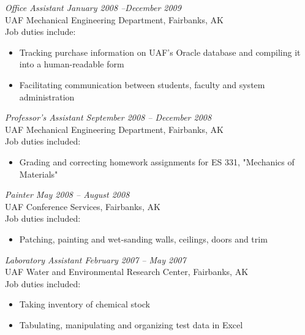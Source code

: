 \documentclass[10pt, letterpaper]{resume}
\begin{document}
\large\textit{Office Assistant \hfill January 2008 --December 2009}\normalsize \\
UAF Mechanical Engineering Department, Fairbanks, AK\\
Job duties include:
\small\begin{itemize}
\item Tracking purchase information on UAF's Oracle database and compiling it
into a human-readable form
\item Facilitating communication between students, faculty and system
administration
\end{itemize}\normalsize\medskip

\large\textit{Professor's Assistant	\hfill September 2008 -- December 2008}\normalsize \\
UAF Mechanical Engineering Department, Fairbanks, AK\\
Job duties included:
\small\begin{itemize}
\item Grading and correcting homework assignments for ES 331, "Mechanics of Materials"
\end{itemize}\normalsize\medskip

\large\textit{Painter	\hfill May 2008 -- August 2008}\normalsize\\
UAF Conference Services, Fairbanks, AK\\
Job duties included:
\small\begin{itemize}
\item Patching, painting and wet-sanding walls, ceilings, doors and trim
\end{itemize}\normalsize\medskip


\large\textit{Laboratory Assistant \hfill February 2007 -- May 2007}\normalsize \\
UAF Water and Environmental Research Center, Fairbanks, AK\\
Job duties included:
\small\begin{itemize}
\item Taking inventory of chemical stock
\item Tabulating, manipulating and organizing test data in Excel
\end{itemize}\normalsize\medskip
\end{document}
